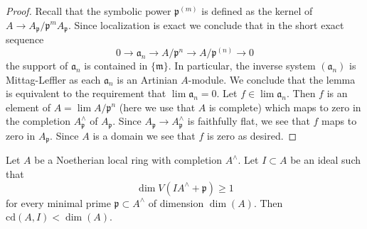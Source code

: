 \begin{proof}
Recall that the symbolic power $\mathfrak p^{(m)}$ is defined as the
kernel of $A \to A_\mathfrak p/\mathfrak p^mA_\mathfrak p$.
Since localization is exact we conclude that in the short exact sequence
$$
0 \to \mathfrak a_n \to A/\mathfrak p^n \to A/\mathfrak p^{(n)} \to 0
$$
the support of $\mathfrak a_n$ is contained in $\{\mathfrak m\}$.
In particular, the inverse system $(\mathfrak a_n)$ is Mittag-Leffler
as each $\mathfrak a_n$ is an Artinian $A$-module.
We conclude that the lemma is equivalent to the requirement
that $\lim \mathfrak a_n = 0$. Let $f \in \lim \mathfrak a_n$.
Then $f$ is an element of $A = \lim A/\mathfrak p^n$
(here we use that $A$ is complete)
which maps to zero in the completion $A_\mathfrak p^\wedge$
of $A_\mathfrak p$. Since $A_\mathfrak p \to A_\mathfrak p^\wedge$
is faithfully flat, we see that $f$ maps to zero in $A_\mathfrak p$.
Since $A$ is a domain we see that $f$ is zero as desired.
\end{proof}

\begin{proposition}
\label{proposition-Hartshorne-Lichtenbaum-vanishing}
\begin{reference}
\cite[Theorem 3.1]{CD}
\end{reference}
Let $A$ be a Noetherian local ring with completion $A^\wedge$.
Let $I \subset A$ be an ideal such that
$$
\dim V(IA^\wedge + \mathfrak p) \geq 1
$$
for every minimal prime $\mathfrak p \subset A^\wedge$ of dimension $\dim(A)$.
Then $\text{cd}(A, I) < \dim(A)$.
\end{proposition}

